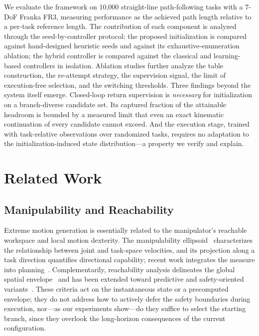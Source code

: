 \documentclass[journal]{IEEEtran}
\newcommand{\nEval}{10{,}000}
\begin{document}
We evaluate the framework on \nEval{} straight-line path-following
tasks with a 7-DoF Franka FR3, measuring performance as the achieved
path length relative to a per-task reference length. The contribution
of each component is analyzed through the seed-by-controller protocol:
the proposed initialization is compared against hand-designed heuristic
seeds and against its exhaustive-enumeration ablation; the hybrid
controller is compared against the classical and learning-based
controllers in isolation. Ablation studies further analyze the table
construction, the re-attempt strategy, the supervision signal, the
limit of execution-free selection, and the switching thresholds. Three
findings beyond the system itself emerge. Closed-loop return
supervision is \textit{necessary} for initialization on a
branch-diverse candidate set. Its captured fraction of the attainable
headroom is bounded by a measured limit that even an exact kinematic
continuation of every candidate cannot exceed. And the execution stage,
trained with task-relative observations over randomized tasks, requires
no adaptation to the initialization-induced state distribution---a
property we verify and explain.

\section{Related Work}

\subsection{Manipulability and Reachability}
Extreme motion generation is essentially related to the manipulator's
reachable workspace and local motion dexterity. The manipulability
ellipsoid~\cite{yoshikawa1985manipulability} characterizes the
relationship between joint and task-space velocities, and its projection
along a task direction quantifies directional capability; recent work
integrates the measure into planning~\cite{jin2017manipulability,
shen2023adaptive,cai2025just}. Complementarily, reachability analysis
delineates the global spatial
envelope~\cite{yang2009placement,makhal2018reuleaux} and has been
extended toward predictive and safety-oriented
variants~\cite{feng2025predictive,jauhri2022robot,selim2022safe}. These
criteria act on the instantaneous state or a precomputed envelope; they
do not address how to actively defer the safety boundaries during
execution, nor---as our experiments show---do they suffice to select the
starting branch, since they overlook the long-horizon consequences of
the current configuration.
\end{document}
